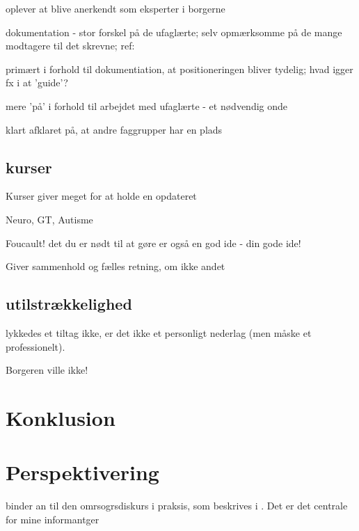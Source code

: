 oplever at blive anerkendt som eksperter i borgerne

dokumentation - stor forskel på de ufaglærte; selv opmærksomme på de mange modtagere til det skrevne; ref: \autocite{hjerrildNarViSkriver2017, andersenUndervisningInstitutionOg2019}

primært i forhold til dokumentiation, at positioneringen bliver tydelig; hvad igger fx i at 'guide'?

mere 'på' i forhold til arbejdet med ufaglærte - et nødvendig onde

klart afklaret på, at andre faggrupper har en plads

\subsection{kurser}
Kurser giver meget for at holde en opdateret

Neuro, GT, Autisme

Foucault! det du er nødt til at gøre er også en god ide - din gode ide!

Giver sammenhold og fælles retning, om ikke andet

\subsection{utilstrækkelighed}
lykkedes et tiltag ikke, er det ikke et personligt nederlag (men måske et professionelt).

Borgeren ville ikke!

\section{Konklusion}

\section{Perspektivering}
binder an til den omrsogrsdiskurs i praksis, som beskrives i . Det er det centrale for mine informantger
